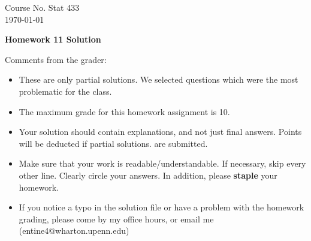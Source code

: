 \documentclass[10pt,a4paper]{article}
\begin{document}
\begin{flushleft}
Course No. Stat 433 \\
\today
\end{flushleft}

\begin{center}
{\Large{\bf  Homework 11 Solution}}
\end{center}

\textcolor[rgb]{0.98,0.00,0.00}{Comments from the grader:}
\begin{itemize}
    \item \textcolor[rgb]{0.98,0.00,0.00}{These are only partial solutions.  We selected
    questions which were the most problematic for the class.}
    \item \textcolor[rgb]{0.98,0.00,0.00}{The maximum grade for this homework assignment is 10.}
    \item \textcolor[rgb]{0.98,0.00,0.00}{Your solution should contain explanations, and not just
    final answers. Points will be deducted if partial solutions.
    are submitted.}
    \item \textcolor[rgb]{0.98,0.00,0.00}{Make sure that your work is readable/understandable.  If necessary, skip every other line.  Clearly circle your answers.  In addition, please {\bf staple} your homework.}
    \item \textcolor[rgb]{0.98,0.00,0.00}{If you notice a typo in the solution file or have a problem with the homework
    grading, please come by my office hours, or email me (entine4@wharton.upenn.edu)}

\end{itemize}
\end{document}

